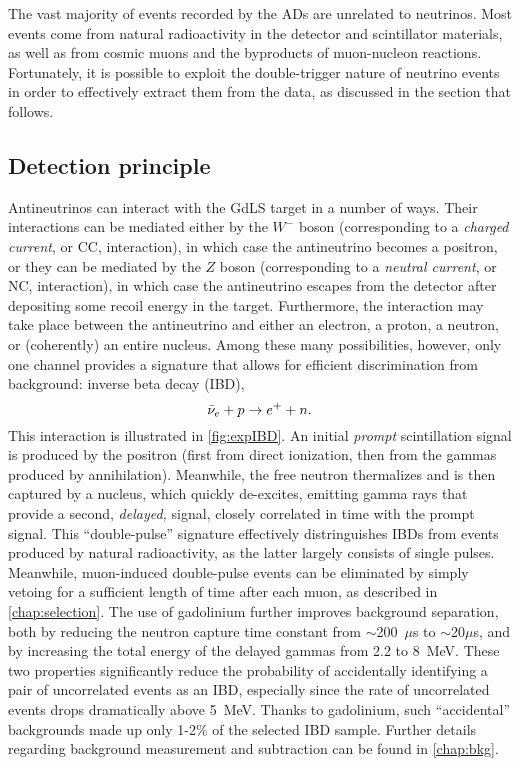 \documentclass[../thesis.tex]{subfiles}
\begin{document}
The vast majority of events recorded by the ADs are unrelated to neutrinos. Most events come from natural radioactivity in the detector and scintillator materials, as well as from cosmic muons and the byproducts of muon-nucleon reactions. Fortunately, it is possible to exploit the double-trigger nature of neutrino events in order to effectively extract them from the data, as discussed in the section that follows.

\subsection{Detection principle}
\label{sec:expDetPrinc}

Antineutrinos can interact with the GdLS target in a number of ways. Their interactions can be mediated either by the $W^-$ boson (corresponding to a \emph{charged current}, or CC, interaction), in which case the antineutrino becomes a positron, or they can be mediated by the $Z$ boson (corresponding to a \emph{neutral current}, or NC, interaction), in which case the antineutrino escapes from the detector after depositing some recoil energy in the target. Furthermore, the interaction may take place between the antineutrino and either an electron, a proton, a neutron, or (coherently) an entire nucleus. Among these many possibilities, however, only one channel provides a signature that allows for efficient discrimination from background: inverse beta decay (IBD),
\begin{equation*}
  \bar\nu_e + p \rightarrow e^+ + n.
\end{equation*}
This interaction is illustrated in \autoref{fig:expIBD}. An initial \emph{prompt} scintillation signal is produced by the positron (first from direct ionization, then from the gammas produced by annihilation). Meanwhile, the free neutron thermalizes and is then captured by a nucleus, which quickly de-excites, emitting gamma rays that provide a second, \emph{delayed,} signal, closely correlated in time with the prompt signal. This ``double-pulse'' signature effectively distringuishes IBDs from events produced by natural radioactivity, as the latter largely consists of single pulses. Meanwhile, muon-induced double-pulse events can be eliminated by simply vetoing for a sufficient length of time after each muon, as described in \autoref{chap:selection}. The use of gadolinium further improves background separation, both by reducing the neutron capture time constant from $\sim$200~$\mu$s to $\sim$20$\mu$s, and by increasing the total energy of the delayed gammas from 2.2 to 8~MeV. These two properties significantly reduce the probability of accidentally identifying a pair of uncorrelated events as an IBD, especially since the rate of uncorrelated events drops dramatically above 5~MeV. Thanks to gadolinium, such ``accidental'' backgrounds made up only 1-2\% of the selected IBD sample. Further details regarding background measurement and subtraction can be found in \autoref{chap:bkg}.
\end{document}
